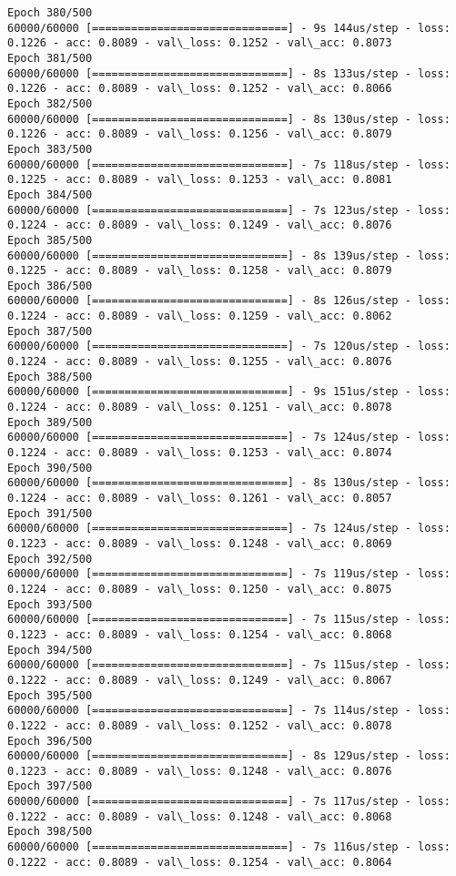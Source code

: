 \documentclass[11pt]{article}
\begin{document}
\begin{Verbatim}[commandchars=\\\{\}]
Epoch 380/500
60000/60000 [==============================] - 9s 144us/step - loss: 0.1226 - acc: 0.8089 - val\_loss: 0.1252 - val\_acc: 0.8073
Epoch 381/500
60000/60000 [==============================] - 8s 133us/step - loss: 0.1226 - acc: 0.8089 - val\_loss: 0.1252 - val\_acc: 0.8066
Epoch 382/500
60000/60000 [==============================] - 8s 130us/step - loss: 0.1226 - acc: 0.8089 - val\_loss: 0.1256 - val\_acc: 0.8079
Epoch 383/500
60000/60000 [==============================] - 7s 118us/step - loss: 0.1225 - acc: 0.8089 - val\_loss: 0.1253 - val\_acc: 0.8081
Epoch 384/500
60000/60000 [==============================] - 7s 123us/step - loss: 0.1224 - acc: 0.8089 - val\_loss: 0.1249 - val\_acc: 0.8076
Epoch 385/500
60000/60000 [==============================] - 8s 139us/step - loss: 0.1225 - acc: 0.8089 - val\_loss: 0.1258 - val\_acc: 0.8079
Epoch 386/500
60000/60000 [==============================] - 8s 126us/step - loss: 0.1224 - acc: 0.8089 - val\_loss: 0.1259 - val\_acc: 0.8062
Epoch 387/500
60000/60000 [==============================] - 7s 120us/step - loss: 0.1224 - acc: 0.8089 - val\_loss: 0.1255 - val\_acc: 0.8076
Epoch 388/500
60000/60000 [==============================] - 9s 151us/step - loss: 0.1224 - acc: 0.8089 - val\_loss: 0.1251 - val\_acc: 0.8078
Epoch 389/500
60000/60000 [==============================] - 7s 124us/step - loss: 0.1224 - acc: 0.8089 - val\_loss: 0.1253 - val\_acc: 0.8074
Epoch 390/500
60000/60000 [==============================] - 8s 130us/step - loss: 0.1224 - acc: 0.8089 - val\_loss: 0.1261 - val\_acc: 0.8057
Epoch 391/500
60000/60000 [==============================] - 7s 124us/step - loss: 0.1223 - acc: 0.8089 - val\_loss: 0.1248 - val\_acc: 0.8069
Epoch 392/500
60000/60000 [==============================] - 7s 119us/step - loss: 0.1224 - acc: 0.8089 - val\_loss: 0.1250 - val\_acc: 0.8075
Epoch 393/500
60000/60000 [==============================] - 7s 115us/step - loss: 0.1223 - acc: 0.8089 - val\_loss: 0.1254 - val\_acc: 0.8068
Epoch 394/500
60000/60000 [==============================] - 7s 115us/step - loss: 0.1222 - acc: 0.8089 - val\_loss: 0.1249 - val\_acc: 0.8067
Epoch 395/500
60000/60000 [==============================] - 7s 114us/step - loss: 0.1222 - acc: 0.8089 - val\_loss: 0.1252 - val\_acc: 0.8078
Epoch 396/500
60000/60000 [==============================] - 8s 129us/step - loss: 0.1223 - acc: 0.8089 - val\_loss: 0.1248 - val\_acc: 0.8076
Epoch 397/500
60000/60000 [==============================] - 7s 117us/step - loss: 0.1222 - acc: 0.8089 - val\_loss: 0.1248 - val\_acc: 0.8068
Epoch 398/500
60000/60000 [==============================] - 7s 116us/step - loss: 0.1222 - acc: 0.8089 - val\_loss: 0.1254 - val\_acc: 0.8064

\end{Verbatim}
\end{document}
